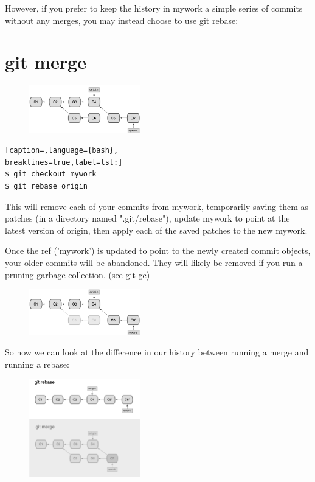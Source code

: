 However, if you prefer to keep the history in mywork a simple series of commits
without any merges, you may instead choose to use git rebase:

\section{git merge}
\begin{figure}[h]
\centering
\includegraphics[width=0.43\textwidth]{content/git/rebase3.png}
\end{figure}

\lstset{basicstyle=\scriptsize, numbers=none, captionpos=b, tabsize=4}
\begin{lstlisting}[caption=,language={bash},
breaklines=true,label=lst:]
$ git checkout mywork
$ git rebase origin
\end{lstlisting}

This will remove each of your commits from mywork, temporarily saving them as
patches (in a directory named ".git/rebase"), update mywork to point at the
latest version of origin, then apply each of the saved patches to the new
mywork.

Once the ref ('mywork') is updated to point to the newly created commit
objects, your older commits will be abandoned. They will likely be removed if
you run a pruning garbage collection. (see git gc)
\begin{figure}[h]
\centering
\includegraphics[width=0.43\textwidth]{content/git/rebase4.png}
\end{figure}

So now we can look at the difference in our history between running a merge and
running a rebase:
\begin{figure}[h]
\centering
\includegraphics[width=0.43\textwidth]{content/git/rebase5.png}
\end{figure}


